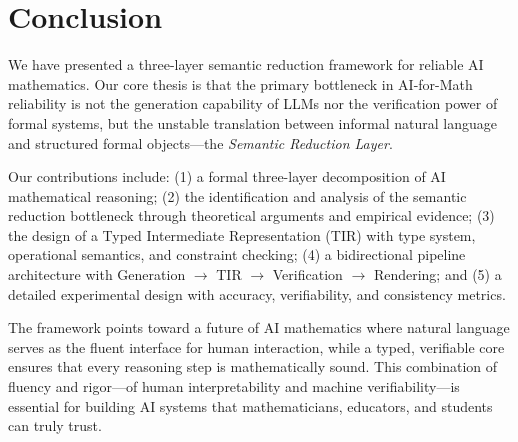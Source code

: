 \documentclass[11pt,a4paper]{article}
\begin{document}
\section{Conclusion}
\label{sec:conclusion}

We have presented a three-layer semantic reduction framework for reliable AI mathematics. Our core thesis is that the primary bottleneck in AI-for-Math reliability is not the generation capability of LLMs nor the verification power of formal systems, but the unstable translation between informal natural language and structured formal objects---the \textit{Semantic Reduction Layer}.

Our contributions include: (1) a formal three-layer decomposition of AI mathematical reasoning; (2) the identification and analysis of the semantic reduction bottleneck through theoretical arguments and empirical evidence; (3) the design of a Typed Intermediate Representation (TIR) with type system, operational semantics, and constraint checking; (4) a bidirectional pipeline architecture with Generation $\to$ TIR $\to$ Verification $\to$ Rendering; and (5) a detailed experimental design with accuracy, verifiability, and consistency metrics.

The framework points toward a future of AI mathematics where natural language serves as the fluent interface for human interaction, while a typed, verifiable core ensures that every reasoning step is mathematically sound. This combination of fluency and rigor---of human interpretability and machine verifiability---is essential for building AI systems that mathematicians, educators, and students can truly trust.



\end{document}
